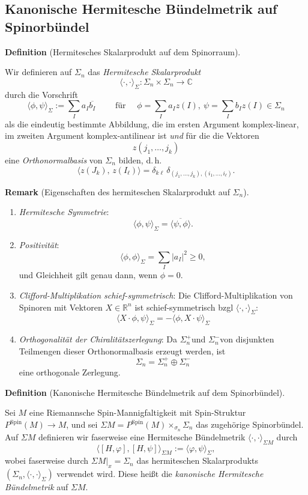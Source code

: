 \documentclass[10pt, letterpaper]{article}
\newcommand{\R}{\mathbb{R}}
\newcommand{\C}{\mathbb{C}}
\newcommand{\Spin}{\mathrm{Spin}}
\newcommand{\CustomHeading}[3]{%
  \par\medskip\noindent%
  \textbf{#1 #2} \textnormal{(#3)}.\enskip%
}
\newenvironment{DEF}[2]{\CustomHeading{Definition}{#1}{#2}}{}
\newenvironment{REM}[2]{\CustomHeading{Remark}{#1}{#2}}{}
\begin{document}
\subsection{Kanonische Hermitesche Bündelmetrik auf Spinorbündel}



\begin{DEF}{}{Hermitesches Skalarprodukt auf dem Spinorraum}
Wir definieren auf $\Sigma_n$ das \emph{Hermitesche Skalarprodukt}
\[
\langle\cdot,\cdot\rangle_\Sigma:\Sigma_n\times \Sigma_n\to \C
\]
durch die Vorschrift 
$$\langle\phi, \psi\rangle_\Sigma:=\sum_I a_I \overline{b_I}\qquad \text{ für }\quad  \phi=\sum_I a_I z(I),\  \psi=\sum_I b_I z(I)\in \Sigma_n$$ 
als die eindeutig bestimmte Abbildung, die im ersten Argument komplex-linear, im zweiten Argument komplex-antilinear ist \emph{und} für die die Vektoren
\[
z(j_1,\dots,j_k)
\]
eine \emph{Orthonormalbasis} von $\Sigma_n$ bilden, d.\,h.
\[
\bigl\langle z(J_k),\, z(I_\ell)\bigr\rangle
=
\delta_{k\ell}\,\delta_{(j_1,\dots,j_k),(i_1,\dots,i_\ell)}.
\]
\end{DEF}

\begin{REM}{}{Eigenschaften des hermiteschen Skalarprodukt auf $\Sigma_n$}
  \begin{enumerate}
    \item \emph{Hermitesche Symmetrie}:
    $$
    \langle\phi, \psi\rangle_\Sigma=\overline{\langle\psi, \phi\rangle} .
    $$
    \item \emph{Positivität}:
    $$
    \langle\phi, \phi\rangle_\Sigma=\sum_I\left|a_I\right|^2 \geq 0,
    $$
    und Gleichheit gilt genau dann, wenn $\phi=0$.
    \item \emph{Clifford-Multiplikation schief-symmetrisch}: Die Clifford-Multiplikation von Spinoren mit Vektoren $X\in\R^n$ ist schief-symmetrisch bzgl $\langle\cdot,\cdot\rangle_\Sigma$:
    $$\langle X \cdot \phi, \psi\rangle_\Sigma= -\langle\phi, X \cdot  \psi\rangle_\Sigma$$
    \item \emph{Orthogonalität der Chiralitätszerlegung}: Da $\Sigma_n^{+}$und $\Sigma_n^{-}$von disjunkten Teilmengen dieser Orthonormalbasis erzeugt werden, ist
    $$
    \Sigma_n=\Sigma_n^{+} \oplus \Sigma_n^{-}
    $$
    eine orthogonale Zerlegung.
  \end{enumerate}
  
\end{REM}




\begin{DEF}{}{Kanonische Hermitesche Bündelmetrik auf dem Spinorbündel}
Sei \(M\) eine Riemannsche Spin-Mannigfaltigkeit mit Spin-Struktur $P^{\Spin}(M)\to M$, und sei $\Sigma M=P^{\Spin}(M)\times_{\sigma_n}\Sigma_n$
das zugehörige Spinorbündel. Auf \(\Sigma M\) definieren wir faserweise eine
Hermitesche Bündelmetrik $\langle\cdot,\cdot\rangle_{\Sigma M}$ durch
\[
\bigl\langle [H,\varphi],[H,\psi]\bigr\rangle_{\Sigma M}
:=
\langle \varphi,\psi\rangle_{\Sigma},
\]
wobei faserweise durch $\Sigma M|_x=\Sigma_n$ das hermiteschen Skalarprodukts $(\Sigma_n,\langle\cdot,\cdot\rangle_\Sigma)$ verwendet wird. Diese heißt die
\emph{kanonische Hermitesche Bündelmetrik} auf \(\Sigma M\).
\end{DEF}
\end{document}

